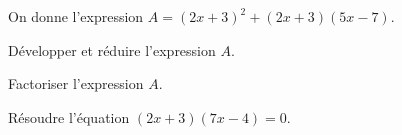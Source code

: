 On donne l'expression $A = (2x + 3)^2 + (2x + 3)(5x - 7)$.
\begin{myenumerate}
\item Développer et réduire l'expression $A$.
\item Factoriser l'expression $A$.
\item Résoudre l'équation $(2x + 3) (7x - 4) = 0$.
\end{myenumerate}
